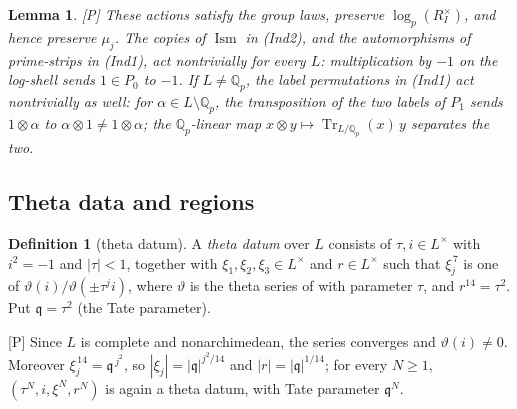 \documentclass[11pt]{article}
\theoremstyle{plain}
\newtheorem{lemma}[theorem]{Lemma}
\theoremstyle{definition}
\newtheorem{definition}[theorem]{Definition}
\theoremstyle{remark}
\newcommand{\Pmark}{\textup{[P]}}
\newcommand{\Qp}[1]{\mathbb Q_{#1}}
\newcommand{\Ism}{\operatorname{Ism}}
\newcommand{\fq}{\mathfrak q}
\begin{document}
\begin{lemma}\label{l:actions}
\Pmark{} These actions satisfy the group laws, preserve $\log_p(R_I^\times)$, and hence
preserve $\mu_j$. The copies of $\Ism$ in (Ind2), and the automorphisms of prime-strips in
(Ind1), act nontrivially for every $L$: multiplication by $-1$ on the log-shell sends
$1\in P_0$ to $-1$. If $L\ne\Qp p$, the label permutations in (Ind1) act nontrivially as
well: for $\alpha\in L\setminus\Qp p$, the transposition of the two labels of $P_1$ sends
$1\otimes\alpha$ to $\alpha\otimes1\ne1\otimes\alpha$; the $\Qp p$-linear map
$x\otimes y\mapsto\operatorname{Tr}_{L/\Qp p}(x)\,y$ separates the two.
\end{lemma}

\subsection{Theta data and regions}

\begin{definition}[theta datum]\label{d:thetadatum}
A \emph{theta datum} over $L$ consists of $\tau,i\in L^\times$ with $i^2=-1$ and
$|\tau|<1$, together with $\xi_1,\xi_2,\xi_3\in L^\times$ and $r\in L^\times$ such that
$\xi_j^{\,7}$ is one of $\vartheta(i)/\vartheta(\pm\tau^j i)$, where $\vartheta$ is the theta
series of \cite[Prop.~1.4]{EtTh} with parameter $\tau$, and $r^{14}=\tau^2$. Put
$\fq=\tau^2$ (the Tate parameter).
\end{definition}

\Pmark{} Since $L$ is complete and nonarchimedean, the series converges and
$\vartheta(i)\ne0$. Moreover $\xi_j^{\,14}=\fq^{\,j^2}$, so $|\xi_j|=|\fq|^{j^2/14}$ and
$|r|=|\fq|^{1/14}$; for every $N\ge1$, $(\tau^N,i,\xi^N,r^N)$ is again a theta datum, with
Tate parameter $\fq^N$.
\end{document}
